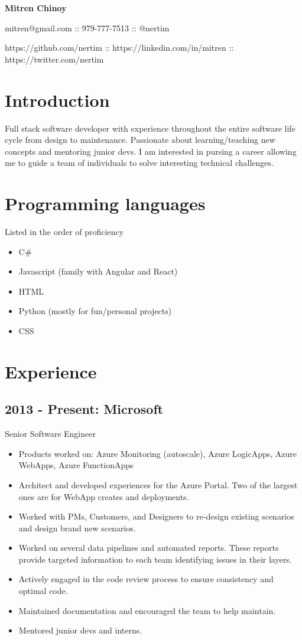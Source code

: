 \documentclass[11pt]{article}
\begin{document}
    \centerline{\textbf{\huge Mitren Chinoy}}
    \centerline{\large mitren@gmail.com :: 979-777-7513 :: @nertim}
    \centerline{\large https://github.com/nertim :: https://linkedin.com/in/mitren :: https://twitter.com/nertim}


    \section*{Introduction}

        Full stack software developer with experience throughout the entire software life cycle from design to maintenance. Passionate about learning/teaching new concepts and mentoring junior devs. I am interested in pursing a career allowing me to guide a team of individuals to solve interesting technical challenges.

    \section*{Programming languages}
    Listed in the order of proficiency
        \begin{itemize}
            \item C\#
            \item Javascript (family with Angular and React)
            \item HTML
            \item Python (mostly for fun/personal projects)
            \item CSS
        \end{itemize}

    \section*{Experience}

        \subsection*{2013 - Present: Microsoft}
            Senior Software Engineer
            \begin{itemize}
                \item Products worked on: Azure Monitoring (autoscale), Azure LogicApps, Azure WebApps, Azure FunctionApps
                \item Architect and developed experiences for the Azure Portal. Two of the largest ones are for WebApp creates and deployments.
                \item Worked with PMs, Customers, and Designers to re-design existing scenarios and design brand new scenarios. 
                \item Worked on several data pipelines and automated reports. These reports provide targeted information to each team identifying issues in their layers. 
                \item Actively engaged in the code review process to ensure consistency and optimal code.
                \item Maintained documentation and encouraged the team to help maintain.
                \item Mentored junior devs and interns.
            \end{itemize}
\end{document}

